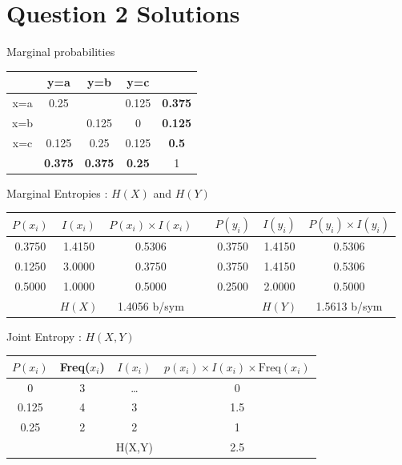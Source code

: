 \documentclass[a4paper,12pt]{article}
\begin{document}
\section*{Question 2 Solutions}
Marginal probabilities
\begin{center}
\begin{tabular}{|c|c|c|c||c|}
\hline	&	y=a	&	y=b	&	y=c	&		\\ \hline
x=a	&	0.25	&		&	0.125	&	\textbf{0.375}	\\ \hline
x=b	&		&	0.125	&	0	&	\textbf{0.125}	\\ \hline
x=c	&	0.125	&	0.25	&	0.125	&	\textbf{0.5	}\\ \hline \hline
	&	\textbf{0.375}	&	\textbf{0.375}	&	\textbf{0.25}	&	1	\\ \hline
\end{tabular}
\end{center}
Marginal Entropies : $H(X)$ and $H(Y)$
\begin{center}
\begin{tabular}{|c|c|c||c||c|c|c|} \hline
$P(x_i)$	&	$I(x_i)$	&	$P(x_i) \times I(x_i)$	&&	$P(y_i)$	&	$I(y_i)$	&	$P(y_i) \times I(y_i)$	\\ \hline \hline
0.3750	&	1.4150	&	0.5306	&&	0.3750	&	1.4150	&	0.5306	\\ \hline
0.1250	&	3.0000	&	0.3750	&&	0.3750	&	1.4150	&	0.5306	\\ \hline
0.5000	&	1.0000	&	0.5000	&&	0.2500	&	2.0000	&	0.5000	\\ \hline \hline
	&	$H(X)$	&	1.4056 b/sym	&&		&	$H(Y)$	&	1.5613 b/sym	\\ \hline
\end{tabular} 
\end{center}
Joint Entropy : $H(X,Y)$
\begin{center}
\begin{tabular}{|c|c|c|c|}
\hline
$P(x_i)$	&	Freq($x_i$)	&	$I(x_i)$	&	$p(x_i)\times I(x_i) \times \mbox{Freq}(x_i)$	\\ \hline
0	&	3	&	\ldots &	0	\\ \hline
0.125	&	4	&	3	&	1.5	\\ \hline
0.25	&	2	&	2	&	1	\\ \hline \hline
& &H(X,Y) & 2.5 \\ \hline
\end{tabular} 
\end{center}



\newpage 
\end{document}
